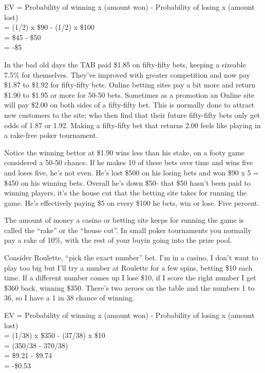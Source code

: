 EV = Probability of winning x (amount won) - Probability of losing x
(amount lost) \\
   = (1/2) x \$90 - (1/2) x \$100 \\
   = \$45 - \$50  \\
   = -\$5

In the bad old days
the TAB paid \$1.85 on fifty-fifty bets, keeping a sizeable 7.5\% for
themselves. They've improved with greater competition and now pay
\$1.87 to \$1.92 for fifty-fifty bets. Online betting sites pay a bit
more and return \$1.90 to \$1.95 or more for 50-50 bets. Sometimes as
a promotion an Online site will pay \$2.00 on both sides of a
fifty-fifty bet. This is normally done to attract new customers to the
site; who then find that their future fifty-fifty bets only get odds
of 1.87 or 1.92. Making a fifty-fifty bet that returns 2.00 feels like
playing in a rake-free poker tournament.


Notice the winning bettor at \$1.90 wins less than his stake,
on a footy game considered a 50-50 chance. If he makes 10 of these
bets over time and wins five and loses five, he's not even. He's lost
\$500 on his losing bets and won \$90 x 5 = \$450 on his winning bets.
Overall he's down \$50- that \$50 hasn't been paid to winning players,
it's the house cut that the betting site takes for running the game.
He's effectively paying \$5 on every \$100 he bets, win or lose.
Five percent.

The amount of money a casino or betting site keeps for running the
game is called the ``rake'' or the ``house cut''.
In small poker tournaments you normally pay a rake of 10\%, with the
rest of your buyin going into the prize pool.

Consider Roulette, ``pick the exact number'' bet. I'm in a casino,
I don't want to play too big but I'll try a number at Roulette for a few
spins, betting \$10 each time. If a different number comes up I lose \$10,
if I score the right number I get \$360 back, winning \$350. There's two
zeroes on the table and the numbers 1 to 36, so I have a 1 in 38 chance of
winning.

EV = Probability of winning x (amount won) - Probability of losing x
(amount lost) \\
   = (1/38) x \$350 - (37/38) x \$10 \\
   = (350/38 - 370/38)  \\
   = \$9.21 - \$9.74 \\
   = -\$0.53

